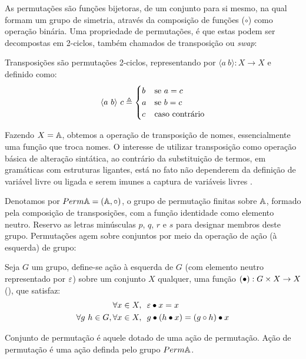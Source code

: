 As permutações são funções bijetoras, de um conjunto para si mesmo, na qual formam um grupo de simetria, através da composição de funções ($\circ$) como operação binária. Uma propriedade de permutações, é que estas podem ser decompostas em 2-ciclos, também chamados de transposição ou \textit{swap}:
\begin{definicao}\label{def:swap}
	Transposições são permutações 2-ciclos, representando por $\langle a~b \rangle : X \rightarrow X$ e definido como:
	\begin{equation}
		\langle a~b \rangle ~c \triangleq 
		\begin{cases}
			b & \text{\normalfont se } a = c \\
			a & \text{\normalfont se } b = c \\
			c & \text{\normalfont caso contrário}
		\end{cases}
	\end{equation} 
\end{definicao}\noindent
Fazendo $X = \mathbb{A}$, obtemos a operação de transposição de nomes, essencialmente uma função que troca nomes. O interesse de utilizar transposição como operação básica de alteração sintática, ao contrário da substituição de termos, em gramáticas com estruturas ligantes, está no fato não dependerem da definição de variável livre ou ligada e serem imunes a captura de variáveis livres \cite{Pitts2003}. 

Denotamos por $Perm \mathbb{A} = (\mathbb{A}, \circ)$, o grupo de permutação finitas sobre $\mathbb{A}$, formado pela composição de transposições, com a função identidade como elemento neutro. Reservo as letras minúsculas $p$, $q$, $r$ e $s$ para designar membros deste grupo. Permutações agem sobre conjuntos por meio da operação de ação (à esquerda) de grupo:
\begin{definicao}
	Seja $G$ um grupo, define-se ação à esquerda de $G$ (com elemento neutro representado por $\varepsilon$) sobre um conjunto $X$ qualquer, uma função $(\bullet) : G \times X \rightarrow X$ (), que satisfaz:
	\begin{align}
		\forall x \in X,&~~ \varepsilon \bullet x = x \label{eq:act-neutral}\\
		\forall g~h \in G, \forall x \in X,&~~ g \bullet (h \bullet x) = (g \circ h) \bullet x \label{eq:act-compat}
	\end{align}
\end{definicao}\noindent
\begin{definicao}\label{def:acao-permutacao}
	Conjunto de permutação é aquele dotado de uma ação de permutação. Ação de permutação é uma ação definda pelo grupo $Perm \mathbb{A}$.
\end{definicao}\noindent

